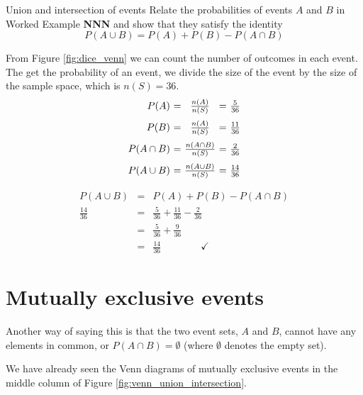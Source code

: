 \begin{wex}{Union and intersection of events}{
  Relate the probabilities of events $A$ and $B$ in Worked Example
  \textbf{NNN} and show that they satisfy the identity
  \[P(A \cup B) = P(A) + P(B) - P(A \cap B)\]
}{
  
  From Figure \ref{fig:dice_venn} we can count the number of outcomes in each
  event. The get the probability of an event, we divide the size of
  the event by the size of the sample space, which is $n(S)=36$.
  \[\begin{array}{r@{$\ =\ $}c@{$\ =\ $}l}
    P(A)        & \frac{n(A)}{n(S)}        & \frac{5}{36}  \\[8pt]
    P(B)        & \frac{n(A)}{n(S)}        & \frac{11}{36} \\[8pt]
    P(A \cap B) & \frac{n(A \cap B)}{n(S)} & \frac{2}{36}  \\[8pt]
    P(A \cup B) & \frac{n(A \cup B)}{n(S)} & \frac{14}{36}
  \end{array}\]

  \begin{eqnarray*}
    P(A \cup B) &=& P(A) + P(B) - P(A \cap B) \\
    \frac{14}{36} &=& \frac{5}{36} + \frac{11}{36} - \frac{2}{36} \\
    &=& \frac{5}{36} + \frac{9}{36} \\
    &=& \frac{14}{36} \qquad\qquad\checkmark
  \end{eqnarray*}
}
\end{wex}

\section{Mutually exclusive events}

Another way of saying this is that the two event sets, $A$ and $B$,
cannot have any elements in common, or $P(A \cap B) = \emptyset$
(where $\emptyset$ denotes the empty set).

We have already seen the Venn diagrams of mutually exclusive events in
the middle column of Figure \ref{fig:venn_union_intersection}.

